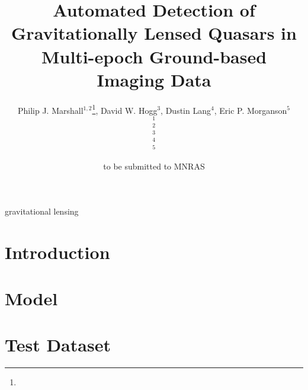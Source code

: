 \documentclass[useAMS,usenatbib]{mn2e}
\title[Automated Gravitational Lens Detection]
{Automated Detection of Gravitationally Lensed Quasars in Multi-epoch
Ground-based Imaging Data}
\author[]{%
  Philip J. Marshall$^{1,2}$\thanks{\pjmemail},
  David W. Hogg$^{3}$,
  Dustin Lang$^{4}$,
  Eric P. Morganson$^{5}$ 
  \medskip\\
  $^1$\oxford\\
  $^2$\kipac\\
  $^3$\nyu\\
  $^4$\cmu\\
  $^5$\mpia
}
\begin{document}
             
\date{to be submitted to MNRAS}
             
\pagerange{\pageref{firstpage}--\pageref{lastpage}}

\maketitle           

\label{firstpage}


\begin{abstract}
\end{abstract}


\begin{keywords}
  gravitational lensing
\end{keywords}

\setcounter{footnote}{1}


\section{Introduction}
\label{sec:intro}



\section{Model}
\label{sec:model}



\section{Test Dataset}
\label{sec:data}

\end{document}
